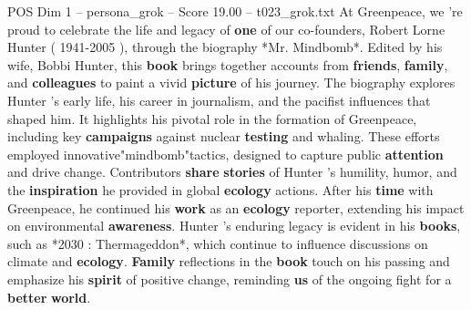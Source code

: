 \begin{textsample}{POS Dim 1 – persona\_grok – Score 19.00 – t023\_grok.txt}  \label{ex:f1_pos_034}
At Greenpeace, we 're proud to celebrate the life and legacy of \textbf{one} of our co-founders, Robert Lorne Hunter ( 1941-2005 ), through the biography *Mr.
Mindbomb*.
Edited by his wife, Bobbi Hunter, this \textbf{book} brings together accounts from \textbf{friends}, \textbf{family}, and \textbf{colleagues} to paint a vivid \textbf{picture} of his journey.
The biography explores Hunter 's early life, his career in journalism, and the pacifist influences that shaped him.
It highlights his pivotal role in the formation of Greenpeace, including key \textbf{campaigns} against nuclear \textbf{testing} and whaling.
These efforts employed innovative"mindbomb"tactics, designed to capture public \textbf{attention} and drive change.
Contributors \textbf{share} \textbf{stories} of Hunter 's humility, humor, and the \textbf{inspiration} he provided in global \textbf{ecology} actions.
After his \textbf{time} with Greenpeace, he continued his \textbf{work} as an \textbf{ecology} reporter, extending his impact on environmental \textbf{awareness}.
Hunter 's enduring legacy is evident in his \textbf{books}, such as *2030 : Thermageddon*, which continue to influence discussions on climate and \textbf{ecology}. \textbf{Family} reflections in the \textbf{book} touch on his passing and emphasize his \textbf{spirit} of positive change, reminding \textbf{us} of the ongoing fight for a \textbf{better} \textbf{world}.

\end{textsample}
